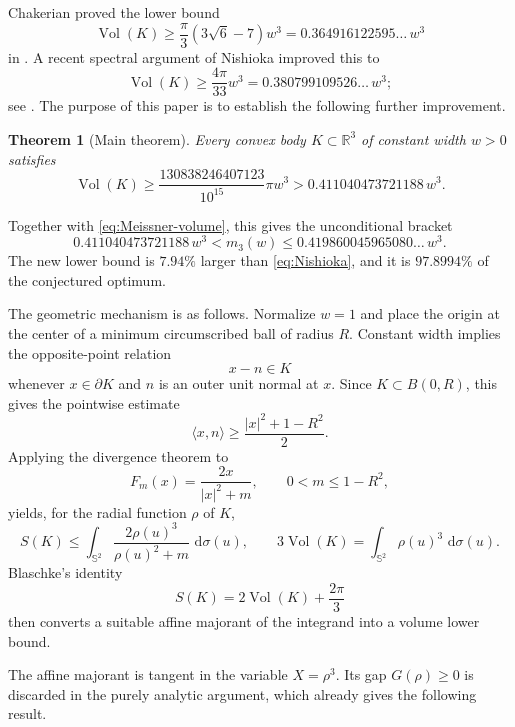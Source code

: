 \documentclass[11pt,reqno]{amsart}
\numberwithin{equation}{section}
\newtheorem{theorem}{Theorem}[section]
\theoremstyle{definition}
\theoremstyle{remark}
\newcommand{\R}{\mathbb{R}}
\newcommand{\Sph}{\mathbb{S}^{2}}
\newcommand{\Vol}{\operatorname{Vol}}
\newcommand{\dd}{\,\mathrm{d}}
\newcommand{\ip}[2]{\langle #1,#2\rangle}
\begin{document}
Chakerian proved the lower bound
\[
 \Vol(K)\geq \frac{\pi}{3}(3\sqrt6-7)w^{3}
 =0.364916122595\ldots\,w^{3}
\]
in \cite{Chakerian1966}. A recent spectral argument of Nishioka improved this to
\begin{equation}\label{eq:Nishioka}
 \Vol(K)\geq \frac{4\pi}{33}w^{3}
 =0.380799109526\ldots\,w^{3};
\end{equation}
see \cite{Nishioka2026}. The purpose of this paper is to establish the following further improvement.

\begin{theorem}[Main theorem]\label{thm:main-intro}
Every convex body $K\subset\R^{3}$ of constant width $w>0$ satisfies
\begin{equation}\label{eq:main-bound-intro}
 \Vol(K)\geq
 \frac{130838246407123}{10^{15}}\pi w^{3}
 >0.411040473721188\,w^{3}.
\end{equation}
\end{theorem}

Together with \eqref{eq:Meissner-volume}, this gives the unconditional bracket
\[
 0.411040473721188\,w^{3}
 <m_3(w)
 \leq 0.419860045965080\ldots\,w^{3}.
\]
The new lower bound is $7.94\%$ larger than \eqref{eq:Nishioka}, and it is $97.8994\%$ of the conjectured optimum.

The geometric mechanism is as follows. Normalize $w=1$ and place the origin at the center of a minimum circumscribed ball of radius $R$. Constant width implies the opposite-point relation
\[
 x-n\in K
\]
whenever $x\in\partial K$ and $n$ is an outer unit normal at $x$. Since $K\subset B(0,R)$, this gives the pointwise estimate
\begin{equation}\label{eq:intro-key}
 \ip{x}{n}\geq \frac{|x|^{2}+1-R^{2}}2.
\end{equation}
Applying the divergence theorem to
\[
 F_m(x)=\frac{2x}{|x|^{2}+m},\qquad 0<m\leq 1-R^{2},
\]
yields, for the radial function $\rho$ of $K$,
\begin{equation}\label{eq:intro-transport}
 S(K)\leq \int_{\Sph}\frac{2\rho(u)^{3}}{\rho(u)^{2}+m}\,\dd\sigma(u),
 \qquad
 3\Vol(K)=\int_{\Sph}\rho(u)^{3}\,\dd\sigma(u).
\end{equation}
Blaschke's identity
\begin{equation}\label{eq:intro-Blaschke}
 S(K)=2\Vol(K)+\frac{2\pi}{3}
\end{equation}
then converts a suitable affine majorant of the integrand into a volume lower bound.

The affine majorant is tangent in the variable $X=\rho^{3}$. Its gap $G(\rho)\geq0$ is discarded in the purely analytic argument, which already gives the following result.
\end{document}
